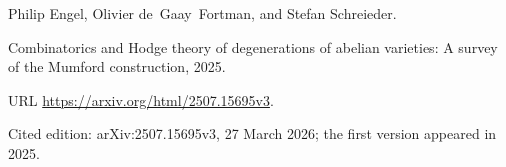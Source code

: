 Philip Engel, Olivier de~Gaay~Fortman, and Stefan Schreieder.

\newblock Combinatorics and {H}odge theory of degenerations of abelian
  varieties: A survey of the {M}umford construction, 2025.

\newblock URL \url{https://arxiv.org/html/2507.15695v3}.

\newblock Cited edition: arXiv:2507.15695v3, 27 March 2026; the first version appeared in 2025.

